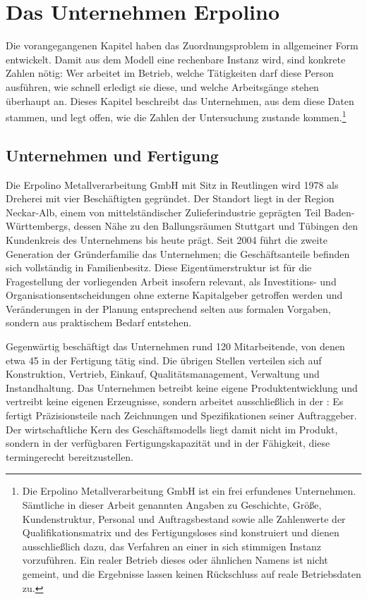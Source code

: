 \chapter{Das Unternehmen Erpolino}
\label{kap:erpolino}

Die vorangegangenen Kapitel haben das Zuordnungsproblem in allgemeiner Form
entwickelt. Damit aus dem Modell eine rechenbare Instanz wird, sind konkrete
Zahlen nötig: Wer arbeitet im Betrieb, welche Tätigkeiten darf diese Person
ausführen, wie schnell erledigt sie diese, und welche Arbeitsgänge stehen
überhaupt an. Dieses Kapitel beschreibt das Unternehmen, aus dem diese Daten
stammen, und legt offen, wie die Zahlen der Untersuchung zustande
kommen.\footnote{Die Erpolino Metallverarbeitung GmbH ist ein frei erfundenes
Unternehmen. Sämtliche in dieser Arbeit genannten Angaben zu Geschichte,
Größe, Kundenstruktur, Personal und Auftragsbestand sowie alle Zahlenwerte der
Qualifikationsmatrix und des Fertigungsloses sind konstruiert und dienen
ausschließlich dazu, das Verfahren an einer in sich stimmigen Instanz
vorzuführen. Ein realer Betrieb dieses oder ähnlichen Namens ist nicht
gemeint, und die Ergebnisse lassen keinen Rückschluss auf reale Betriebsdaten
zu.}

\section{Unternehmen und Fertigung}
\label{sec:unternehmen}

Die Erpolino Metallverarbeitung GmbH mit Sitz in Reutlingen wird 1978 als
Dreherei mit vier Beschäftigten gegründet. Der Standort liegt in der Region
Neckar-Alb, einem von mittelständischer Zulieferindustrie geprägten Teil
Baden-Württembergs, dessen Nähe zu den Ballungsräumen Stuttgart und Tübingen
den Kundenkreis des Unternehmens bis heute prägt. Seit 2004 führt die zweite
Generation der Gründerfamilie das Unternehmen; die Geschäftsanteile befinden
sich vollständig in Familienbesitz. Diese Eigentümerstruktur ist für die
Fragestellung der vorliegenden Arbeit insofern relevant, als Investitions- und
Organisationsentscheidungen ohne externe Kapitalgeber getroffen werden und
Veränderungen in der Planung entsprechend selten aus formalen Vorgaben,
sondern aus praktischem Bedarf entstehen.

Gegenwärtig beschäftigt das Unternehmen rund 120 Mitarbeitende, von denen etwa
45 in der Fertigung tätig sind. Die übrigen Stellen verteilen sich auf
Konstruktion, Vertrieb, Einkauf, Qualitätsmanagement, Verwaltung und
Instandhaltung. Das Unternehmen betreibt keine eigene Produktentwicklung und
vertreibt keine eigenen Erzeugnisse, sondern arbeitet ausschließlich in der
: Es fertigt Präzisionsteile nach Zeichnungen und
Spezifikationen seiner Auftraggeber. Der wirtschaftliche Kern des
Geschäftsmodells liegt damit nicht im Produkt, sondern in der verfügbaren
Fertigungskapazität und in der Fähigkeit, diese termingerecht bereitzustellen.

